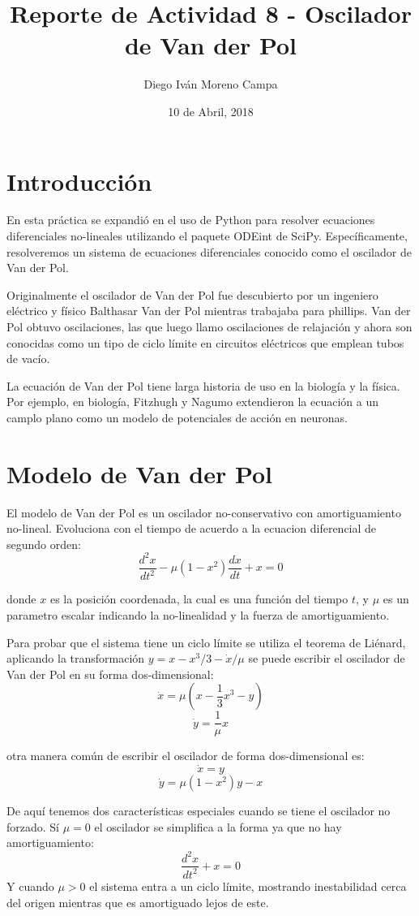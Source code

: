 \documentclass{article}
\title{Reporte de Actividad 8 - Oscilador de Van der Pol}
\author{Diego Iván Moreno Campa}
\date{10 de Abril, 2018}
\begin{document}
\maketitle

\bigskip

\section{Introducción}

En esta práctica se expandió en el uso de Python para resolver ecuaciones diferenciales no-lineales utilizando el paquete ODEint de SciPy. Específicamente, resolveremos un sistema de ecuaciones diferenciales conocido como el oscilador de Van der Pol.

Originalmente el oscilador de Van der Pol fue descubierto por un ingeniero eléctrico y físico Balthasar Van der Pol mientras trabajaba para phillips. Van der Pol obtuvo oscilaciones, las que luego llamo oscilaciones de relajación y ahora son conocidas como un tipo de ciclo límite en circuitos eléctricos que emplean tubos de vacío.

La ecuación de Van der Pol tiene larga historia de uso en la biología y la física. Por ejemplo, en biología, Fitzhugh y Nagumo extendieron la ecuación a un camplo plano como un modelo de potenciales de acción en neuronas.
\section{Modelo de Van der Pol}

El modelo de Van der Pol es un oscilador no-conservativo con amortiguamiento no-lineal. Evoluciona con el tiempo de acuerdo a la ecuacion diferencial de segundo orden:
\[ \frac{d^2x}{dt^2}-\mu(1-x^2)\frac{dx}{dt}+x=0 \]

donde $x$ es la posición coordenada, la cual es una función del tiempo $t$, y $\mu$ es un parametro escalar indicando la no-linealidad y la fuerza de amortiguamiento.

Para probar que el sistema tiene un ciclo límite se utiliza el teorema de Liénard, aplicando la transformación $y=x-x^3/3-\dot{x}/\mu$ se puede escribir el oscilador de Van der Pol en su forma dos-dimensional:
\[ \dot{x} = \mu \left(x-\frac{1}{3}x^3-y \right) \]
\[ \dot{y} = \frac{1}{\mu}x \]

otra manera común de escribir el oscilador de forma dos-dimensional es:
\[ \dot{x} = y \]
\[ \dot{y} = \mu(1-x^2)y-x \]

De aquí tenemos dos características especiales cuando se tiene el oscilador no forzado.
Sí $\mu=0$ el oscilador se simplifica a la forma ya que no hay amortiguamiento:
\[ \frac{d^2x}{dt^2}+x=0 \]
Y cuando $\mu>0$ el sistema entra a un ciclo límite, mostrando inestabilidad cerca del origen mientras que es amortiguado lejos de este.
\end{document}

